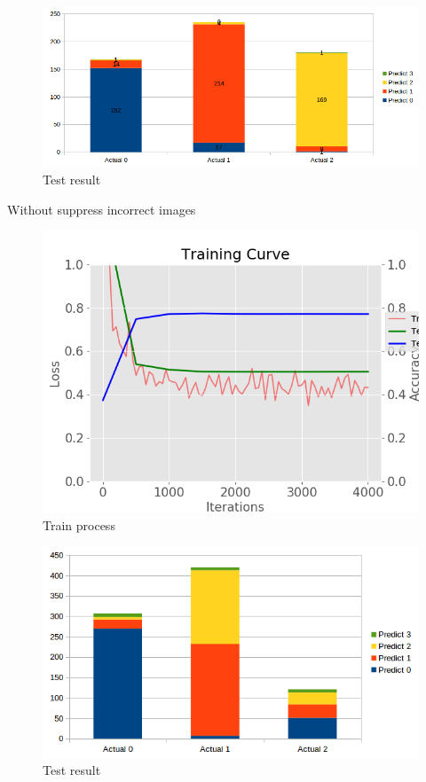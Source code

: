 \documentclass[11pt]{article}
\begin{document}
\begin{figure}[H]
\centering
\includegraphics[width=1\textwidth]{images/70_10_20_result_dataset_from_unsupervised}
\caption{Test result}
\end{figure}

Without suppress incorrect images

\begin{figure}[H]
\centering
\includegraphics[width=1\textwidth]{images/train_dataset_from_unsuppress_unsupervised}
\caption{Train process}
\end{figure}

\begin{figure}[H]
\centering
\includegraphics[width=1\textwidth]{images/result_dataset_from_unsuppress_unsupervised}
\caption{Test result}
\end{figure}
\end{document}
